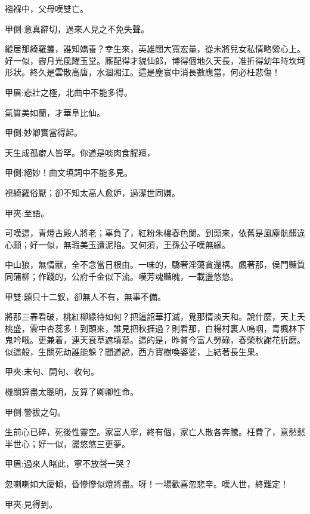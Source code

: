 \begin{qute2sp}
    襁褓中，父母嘆雙亡。\begin{note}甲側:意真辭切，過來人見之不免失聲。\end{note}縱居那綺羅叢，誰知嬌養？幸生來，英雄闊大寬宏量，從未將兒女私情略縈心上。好一似，霽月光風耀玉堂。廝配得才貌仙郎，博得個地久天長，准折得幼年時坎坷形狀。終久是雲散高唐，水涸湘江。這是塵寰中消長數應當，何必枉悲傷！\begin{note}甲眉:悲壯之極，北曲中不能多得。\end{note}
\end{qute2sp}


\begin{qute2sp}
    氣質美如蘭，才華阜比仙。\begin{note}甲側:妙卿實當得起。\end{note}天生成孤癖人皆罕。你道是啖肉食腥羶，\begin{note}甲側:絕妙！曲文填詞中不能多見。\end{note}視綺羅俗厭；卻不知太高人愈妒，過潔世同嫌。\begin{note}甲夾:至語。\end{note}可嘆這，青燈古殿人將老；辜負了，紅粉朱樓春色闌。到頭來，依舊是風塵骯髒違心願；好一似，無瑕美玉遭泥陷。又何須，王孫公子嘆無緣。
\end{qute2sp}


\begin{qute2sp}
    中山狼，無情獸，全不念當日根由。一味的，驕奢淫蕩貪還構。覷著那，侯門豔質同蒲柳；作踐的，公府千金似下流。嘆芳魂豔魄，一載盪悠悠。\begin{note}甲雙:題只十二釵，卻無人不有，無事不備。\end{note}
\end{qute2sp}


\begin{qute2sp}
    將那三春看破，桃紅柳綠待如何？把這韶華打滅，覓那情淡天和。說什麼，天上夭桃盛，雲中杏蕊多！到頭來，誰見把秋捱過？則看那，白楊村裏人嗚咽，青楓林下鬼吟哦。更兼着，連天衰草遮墳墓。這的是，昨貧今富人勞碌，春榮秋謝花折磨。似這般，生關死劫誰能躲？聞道說，西方寶樹喚婆娑，上結著長生果。\begin{note}甲夾:末句、開句、收句。\end{note}
\end{qute2sp}


\begin{qute2sp}
    機關算盡太聰明，反算了卿卿性命。\begin{note}甲側:警拔之句。\end{note}生前心已碎，死後性靈空。家富人寧，終有個，家亡人散各奔騰。枉費了，意憖憖半世心；好一似，盪悠悠三更夢。\begin{note}甲眉:過來人睹此，寧不放聲一哭？\end{note}忽喇喇如大廈傾，昏慘慘似燈將盡。呀！一場歡喜忽悲辛。嘆人世，終難定！\begin{note}甲夾:見得到。\end{note}
\end{qute2sp}


